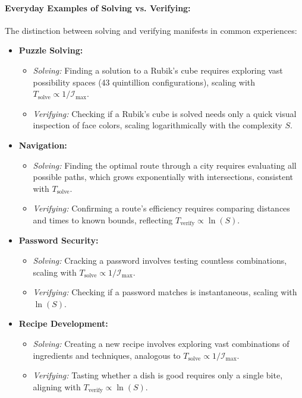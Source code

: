 \documentclass[12pt]{article}
\begin{document}
\paragraph{Everyday Examples of Solving vs. Verifying:}
The distinction between solving and verifying manifests in common experiences:
\begin{itemize}
    \item \textbf{Puzzle Solving:}
        \begin{itemize}
            \item \textit{Solving:} Finding a solution to a Rubik's cube requires exploring vast possibility spaces (43 quintillion configurations), scaling with \(T_{\text{solve}} \propto 1/\mathcal{I}_{\text{max}}\).
            \item \textit{Verifying:} Checking if a Rubik's cube is solved needs only a quick visual inspection of face colors, scaling logarithmically with the complexity \(S\).
        \end{itemize}
    
    \item \textbf{Navigation:}
        \begin{itemize}
            \item \textit{Solving:} Finding the optimal route through a city requires evaluating all possible paths, which grows exponentially with intersections, consistent with \(T_{\text{solve}}\).
            \item \textit{Verifying:} Confirming a route's efficiency requires comparing distances and times to known bounds, reflecting \(T_{\text{verify}} \propto \ln(S)\).
        \end{itemize}
        
    \item \textbf{Password Security:}
        \begin{itemize}
            \item \textit{Solving:} Cracking a password involves testing countless combinations, scaling with \(T_{\text{solve}} \propto 1/\mathcal{I}_{\text{max}}\).
            \item \textit{Verifying:} Checking if a password matches is instantaneous, scaling with \(\ln(S)\).
        \end{itemize}
        
    \item \textbf{Recipe Development:}
        \begin{itemize}
            \item \textit{Solving:} Creating a new recipe involves exploring vast combinations of ingredients and techniques, analogous to \(T_{\text{solve}} \propto 1/\mathcal{I}_{\text{max}}\).
            \item \textit{Verifying:} Tasting whether a dish is good requires only a single bite, aligning with \(T_{\text{verify}} \propto \ln(S)\).
        \end{itemize}
\end{itemize}
\end{document}
